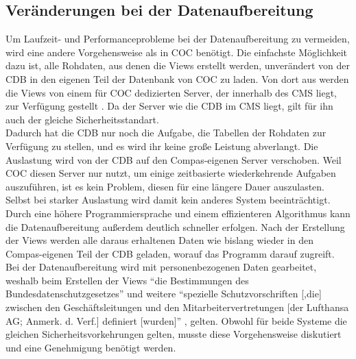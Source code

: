 \documentclass [12pt, a4paper, oneside, titlepage, ngerman]{article}
\begin{document}
\subsection{Veränderungen bei der Datenaufbereitung}
Um Laufzeit- und Performanceprobleme bei der Datenaufbereitung zu vermeiden, wird eine andere Vorgehensweise als in \ac{COC} benötigt. Die einfachste Möglichkeit dazu ist, alle Rohdaten, aus denen die Views erstellt werden, unverändert von der \ac{CDB} in den eigenen Teil der Datenbank von \ac{COC} zu laden. Von dort aus werden die Views von einem für \ac{COC} dedizierten Server, der innerhalb des \ac{CMS} liegt, zur Verfügung gestellt \cite[vgl. dazu][]{Gespraech5}. Da der Server wie die \ac{CDB} im \ac{CMS} liegt, gilt für ihn auch der gleiche Sicherheitsstandart.\\
Dadurch hat die \ac{CDB} nur noch die Aufgabe, die Tabellen der Rohdaten zur Verfügung zu stellen, und es wird ihr keine große Leistung abverlangt. Die Auslastung wird von der \ac{CDB} auf den Compas-eigenen Server verschoben. Weil \ac{COC} diesen Server nur nutzt, um einige zeitbasierte wiederkehrende Aufgaben auszuführen, ist es kein Problem, diesen für eine längere Dauer auszulasten. Selbst bei starker Auslastung wird damit kein anderes System beeinträchtigt. Durch eine höhere Programmiersprache und einem effizienteren Algorithmus kann die Datenaufbereitung außerdem deutlich schneller erfolgen. Nach der Erstellung der Views werden alle daraus erhaltenen Daten wie bislang wieder in den Compas-eigenen Teil der \ac{CDB} geladen, worauf das Programm darauf zugreift. \\

\noindent Bei der Datenaufbereitung wird mit personenbezogenen Daten gearbeitet, weshalb beim Erstellen der Views "`die Bestimmungen des Bundesdatenschutzgesetzes"' \cite[S.6]{CMS} und weitere "`spezielle Schutzvorschriften [,die] zwischen den Geschäftsleitungen und den Mitarbeitervertretungen [der Lufthansa AG; Anmerk. d. Verf.] definiert [wurden]"' \cite[S.6]{CMS}, gelten. Obwohl für beide Systeme die gleichen Sicherheitsvorkehrungen gelten, musste diese Vorgehensweise diskutiert und eine Genehmigung benötigt werden. 
\end{document}
